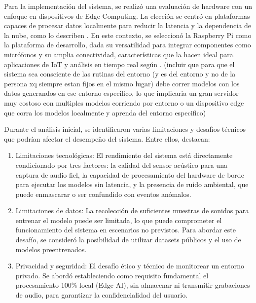 Para la implementación del sistema, se realizó una evaluación de hardware con un enfoque en dispositivos de Edge Computing. La elección se centró en plataformas capaces de procesar datos localmente para reducir la latencia y la dependencia de la nube, como lo describen \citeauthor{shi_edge_2016} \citeyear{shi_edge_2016}. En este contexto, se seleccionó la Raspberry Pi como la plataforma de desarrollo, dada su versatilidad para integrar componentes como micrófonos y su amplia conectividad, características que la hacen ideal para aplicaciones de IoT y análisis en tiempo real según \citeauthor{richardson_getting_2016} \citeyear{richardson_getting_2016}. (incluir que para que el sistema sea consciente de las rutinas del entorno (y es del entorno y no de la persona xq siempre estan fijos en el mismo lugar) debe correr modelos con los datos generandos en ese entorno especifico, lo que  implicaria un gran servidor muy costoso con multiples modelos corriendo por entorno o un dispositivo edge que corra los modelos localmente y aprenda del entorno especifico)


Durante el análisis inicial, se identificaron varias limitaciones y desafíos técnicos que podrían afectar el desempeño del sistema. Entre ellos, destacan:

\begin{enumerate}
      \item Limitaciones tecnológicas: El rendimiento del sistema está directamente condicionado por tres factores: la calidad del sensor acústico para una captura de audio fiel, la capacidad de procesamiento del hardware de borde para ejecutar los modelos sin latencia, y la presencia de ruido ambiental, que puede enmascarar o ser confundido con eventos anómalos.
      \item Limitaciones de datos: La recolección de suficientes muestras de sonidos para entrenar el modelo puede ser limitada, lo que puede comprometer el funcionamiento del sistema en escenarios no previstos. Para abordar este desafío, se consideró la posibilidad de utilizar datasets públicos y el uso de modelos preentrenados.
      \item Privacidad y seguridad: El desafío ético y técnico de monitorear un entorno privado. Se abordó estableciendo como requisito fundamental el procesamiento 100\% local (Edge AI), sin almacenar ni transmitir grabaciones de audio, para garantizar la confidencialidad del usuario.
\end{enumerate}

